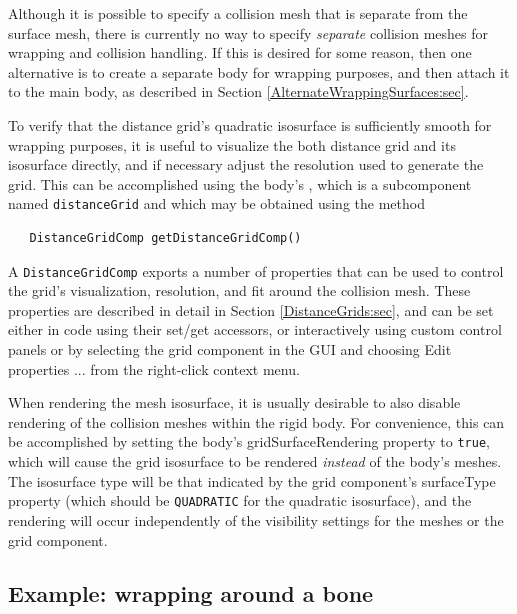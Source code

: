 Although it is possible to specify a collision mesh that is separate
from the surface mesh, there is currently no way to specify {\it separate}
collision meshes for wrapping and collision handling.  If this is
desired for some reason, then one alternative is to create a separate
body for wrapping purposes, and then attach it to the main body, as
described in Section \ref{AlternateWrappingSurfaces:sec}.

To verify that the distance grid's quadratic isosurface is
sufficiently smooth for wrapping purposes, it is useful to visualize
the both distance grid and its isosurface directly, and if necessary
adjust the resolution used to generate the grid. This can be
accomplished using the body's
, which is a
subcomponent named {\tt distanceGrid} and which may be obtained using
the method
%
\begin{lstlisting}
   DistanceGridComp getDistanceGridComp()
\end{lstlisting}
%
A {\tt DistanceGridComp} exports a number of properties that can be
used to control the grid's visualization, resolution, and fit around
the collision mesh. These properties are described in detail in
Section \ref{DistanceGrids:sec}, and can be set either in code using
their set/get accessors, or interactively using custom control panels
or by selecting the grid component in the GUI and choosing {\sf Edit
properties ...} from the right-click context menu.

\begin{sideblock}
When rendering the mesh isosurface, it is usually desirable to also
disable rendering of the collision meshes within the rigid body.  For
convenience, this can be accomplished by setting the body's {\sf
gridSurfaceRendering} property to {\tt true}, which will cause the
grid isosurface to be rendered {\it instead} of the body's meshes.
The isosurface type will be that indicated by the grid component's
{\sf surfaceType} property (which should be {\tt QUADRATIC} for the
quadratic isosurface), and the rendering will occur independently of
the visibility settings for the meshes or the grid component.
\end{sideblock}

\subsection{Example: wrapping around a bone}
\label{TalusWrapping:sec}

